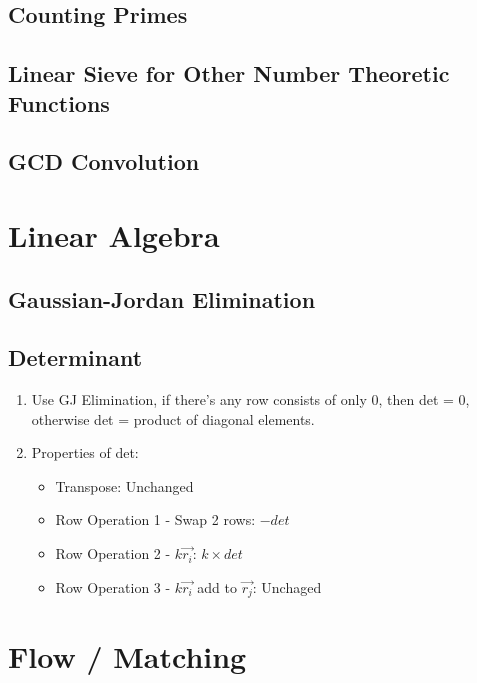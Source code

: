 \documentclass[a4paper,10pt,twocolumn,oneside]{article}
\begin{document}
\subsection{Counting Primes}


\subsection{Linear Sieve for Other Number Theoretic Functions}


\subsection{GCD Convolution}



\section{Linear Algebra}

\subsection{Gaussian-Jordan Elimination}


\subsection{Determinant}
{\normalsize
\noindent
\begin{enumerate}
\item Use GJ Elimination, if there's any row consists of only 0, then det = 0, otherwise det = product of diagonal elements.
\item Properties of det:
\begin{itemize}
    \item Transpose: Unchanged
    \item Row Operation 1 - Swap 2 rows: $-det$
    \item Row Operation 2 - $k \overrightarrow{r_i}$: $k \times det$
    \item Row Operation 3 - $k \overrightarrow{r_i}$ add to  $\overrightarrow{r_j}$: Unchaged
\end{itemize}
\end{enumerate}
}

\section{Flow / Matching}
\end{document}
